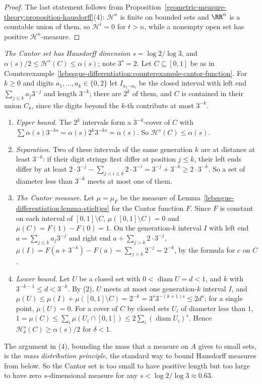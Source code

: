 \begin{proof}
The last statement follows from Proposition~\ref{geometric-measure-theory:proposition-hausdorff}(4): $\mathcal{H}^n$ is finite on bounded sets and $\RR^n$ is a countable union of them, so
$\mathcal{H}^t = 0$ for $t > n$, while a nonempty open set has positive $\mathcal{H}^n$-measure.
\end{proof}

\begin{example}\label{geometric-measure-theory:example-cantor-dimension}
\emph{The Cantor set has Hausdorff dimension $s = \log 2/\log 3$}, and $\alpha(s)/2 \leq \mathcal{H}^s(C) \leq \alpha(s)$; note $3^s = 2$. Let $C \subseteq [0, 1]$ be as in
Counterexample~\ref{lebesgue-differentiation:counterexample-cantor-function}. For $k \geq 0$ and digits $a_1, \ldots, a_k \in \{0, 2\}$ let $I_{a_1\cdots a_k}$ be the closed interval with left end
$\sum_{j \leq k}a_j3^{-j}$ and length $3^{-k}$; there are $2^k$ of them, and $C$ is contained in their union $C_k$, since the digits beyond the $k$-th contribute at most $3^{-k}$.
\begin{enumerate}
\item \emph{Upper bound.} The $2^k$ intervals form a $3^{-k}$-cover of $C$ with $\sum\alpha(s)3^{-ks} = \alpha(s)2^k3^{-ks} = \alpha(s)$. So $\mathcal{H}^s(C) \leq \alpha(s)$.
\item \emph{Separation.} Two of these intervals of the same generation $k$ are at distance at least $3^{-k}$: if their digit strings first differ at position $j \leq k$, their left ends differ by
at least $2 \cdot 3^{-j} - \sum_{j < i \leq k}2 \cdot 3^{-i} = 3^{-j} + 3^{-k} \geq 2 \cdot 3^{-k}$. So a set of diameter less than $3^{-k}$ meets at most one of them.
\item \emph{The Cantor measure.} Let $\mu = \mu_F$ be the measure of Lemma~\ref{lebesgue-differentiation:lemma-stieltjes} for the Cantor function $F$. Since $F$ is constant on each interval of
$[0, 1] \setminus C$, $\mu([0, 1] \setminus C) = 0$ and $\mu(C) = F(1) - F(0) = 1$. On the generation-$k$ interval $I$ with left end $a = \sum_{j \leq k}a_j3^{-j}$ and right end
$a + \sum_{j > k}2 \cdot 3^{-j}$, $\mu(I) = F(a + 3^{-k}) - F(a) = \sum_{j > k}2^{-j} = 2^{-k}$, by the formula for $c$ on $C$.
\item \emph{Lower bound.} Let $U$ be a closed set with $0 < \operatorname{diam}U = d < 1$, and $k$ with $3^{-k-1} \leq d < 3^{-k}$. By (2), $U$ meets at most one generation-$k$ interval $I$,
and $\mu(U) \leq \mu(I) + \mu([0, 1] \setminus C) = 2^{-k} = 3^s3^{-(k+1)s} \leq 2d^s$; for a single point, $\mu(U) = 0$. For a cover of $C$ by closed sets $U_i$ of diameter less than $1$,
$1 = \mu(C) \leq \sum_i\mu(U_i \cap [0, 1]) \leq 2\sum_i(\operatorname{diam}U_i)^s$. Hence $\mathcal{H}^s_\delta(C) \geq \alpha(s)/2$ for $\delta < 1$.
\end{enumerate}
The argument in (4), bounding the mass that a measure on $A$ gives to small sets, is the \emph{mass distribution principle}, the standard way to bound Hausdorff measures from below. So the Cantor
set is too small to have positive length but too large to have zero $s$-dimensional measure for any $s < \log 2/\log 3 \approx 0.63$.
\end{example}

